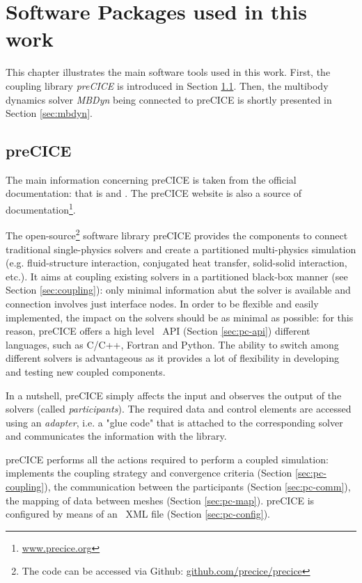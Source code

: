 \chapter{Software Packages used in this work}
\label{cha:software}

This chapter illustrates the main software tools used in this work. First, the coupling library \textit{preCICE} is introduced in Section \ref{sec:precice}. Then, the multibody dynamics solver \textit{MBDyn} being connected to preCICE is shortly presented in Section \ref{sec:mbdyn}.


\section{preCICE}
\label{sec:precice}

The main information concerning preCICE is taken from the official documentation: that is \cite{gatzhammer2014efficient} and  \cite{bungartz2016precice}. The preCICE website is also a source of documentation\footnote{\href{http://www.precice.org}{www.precice.org}}.

The open-source\footnote{The code can be accessed via Github: \href{https://github.com/precice/precice}{github.com/precice/precice}} software library preCICE provides the components to connect traditional single-physics solvers and create a partitioned multi-physics simulation (e.g. fluid-structure interaction, conjugated heat transfer, solid-solid interaction, etc.).
It aims at coupling existing solvers in a partitioned black-box manner (see Section \ref{sec:coupling}):  only minimal information abut the solver is available and connection involves just interface nodes. 
In order to be flexible and easily implemented, the impact on the solvers should be as minimal as possible: for this reason, preCICE offers a high level ~\ac{API} (Section \ref{sec:pc-api}) different languages, such as C/C++, Fortran and Python.
The ability to switch among different solvers is advantageous as it provides a lot of flexibility in developing and testing new coupled components.

In a nutshell, preCICE simply affects the input and observes the output of the solvers (called \textit{participants}). The required data and control elements are accessed using an \textit{adapter}, i.e. a "glue code" that is attached to the corresponding solver and communicates the information with the library.

preCICE performs all the actions required to perform a coupled simulation: implements the coupling strategy and convergence criteria (Section \ref{sec:pc-coupling}), the communication
between the participants (Section \ref{sec:pc-comm}), the mapping of data between meshes (Section \ref{sec:pc-map}). preCICE is configured by means of an ~\ac{XML} file (Section \ref{sec:pc-config}).




